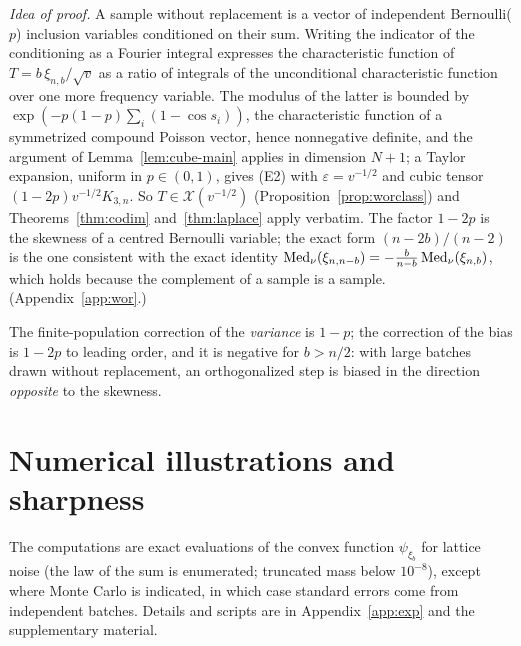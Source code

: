 \documentclass[anon,12pt]{colt2026}
\begin{document}
\begin{theorem}\label{thm:wor}\StmtWor\end{theorem}

\noindent\emph{Idea of proof.} A sample without replacement is a vector of independent Bernoulli($p$) inclusion variables
conditioned on their sum. Writing the indicator of the conditioning as a Fourier integral expresses the characteristic
function of $T=b\,\xi_{n,b}/\sqrt v$ as a ratio of integrals of the unconditional characteristic function over one more
frequency variable. The modulus of the latter is bounded by $\exp(-p(1-p)\sum_i(1-\cos s_i))$, the characteristic
function of a symmetrized compound Poisson vector, hence nonnegative definite, and the argument of
Lemma~\ref{lem:cube-main} applies in dimension $N+1$; a Taylor expansion, uniform in $p\in(0,1)$, gives \textup{(E2)}
with $\varepsilon=v^{-1/2}$ and cubic tensor $(1-2p)v^{-1/2}K_{3,n}$. So $T\in\mathcal X(v^{-1/2})$
(Proposition~\ref{prop:worclass}) and Theorems~\ref{thm:codim} and~\ref{thm:laplace} apply verbatim. The factor
$1-2p$ is the skewness of a centred Bernoulli variable; the exact form $(n-2b)/(n-2)$ is the one consistent with the
exact identity $\operatorname{Med}_\nu(\xi_{n,n-b})=-\frac b{n-b}\operatorname{Med}_\nu(\xi_{n,b})$, which holds because the complement of a sample is a
sample. (Appendix~\ref{app:wor}.)

\smallskip
The finite-population correction of the \emph{variance} is $1-p$; the correction of the bias is $1-2p$ to leading
order, and it is negative for $b>n/2$: with large batches drawn without replacement, an orthogonalized step is biased
in the direction \emph{opposite} to the skewness.

\section{Numerical illustrations and sharpness}\label{sec:exp}

The computations are exact evaluations of the convex function $\psi_{\xi_b}$ for lattice noise (the law of the sum is
enumerated; truncated mass below $10^{-8}$), except where Monte Carlo is indicated, in which case standard errors come
from independent batches. Details and scripts are in Appendix~\ref{app:exp} and the supplementary material.
\end{document}
